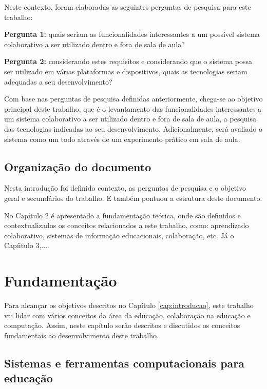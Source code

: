 Neste contexto, foram elaboradas as seguintes perguntas de pesquisa para este trabalho:

\textbf{Pergunta 1:} quais seriam as funcionalidades interessantes a um possível sistema colaborativo a ser utilizado dentro e fora de sala de aula?

\textbf{Pergunta 2:} considerando estes requisitos e considerando que o sistema possa ser utilizado em várias plataformas e dispositivos, quais as tecnologias seriam adequadas a seu desenvolvimento?

Com base nas perguntas de pesquisa definidas anteriormente, chega-se ao objetivo principal deste trabalho, que é o levantamento das funcionalidades interessantes a um sistema colaborativo a ser utilizado dentro e fora de sala de aula, a pesquisa das tecnologias indicadas ao seu desenvolvimento. Adicionalmente, será avaliado o sistema como um todo através de um experimento prático em sala de aula.

\section{Organização do documento}

Nesta introdução foi definido contexto, as perguntas de pesquisa e o objetivo geral e secundários do trabalho. E também pontuou a estrutura deste documento.

No Capítulo 2 é apresentado a fundamentação teórica, onde são definidos e contextualizados os conceitos relacionados a este trabalho, como: aprendizado colaborativo, sistemas de informação educacionais, colaboração, etc. Já o Capíitulo 3,....


\chapter{Fundamentação}
\label{cap:fundamentacao}

Para alcançar os objetivos descritos no Capítulo \ref{cap:introducao}, este trabalho vai lidar com vários conceitos da área da educação, colaboração na educação e computação. Assim, neste capítulo serão descritos e discutidos os conceitos fundamentais ao desenvolvimento deste trabalho.

\section{Sistemas e ferramentas computacionais para educação}


